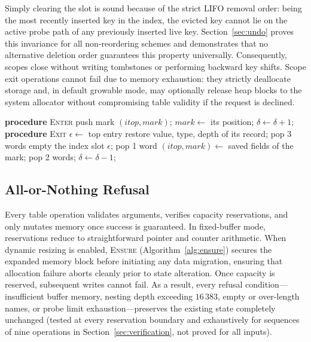 Simply clearing the slot is sound because of the strict LIFO removal order: being the most recently inserted key in the index, the evicted key cannot lie on the active probe path of any previously inserted live key. Section~\ref{sec:undo} proves this invariance for all non-reordering schemes and demonstrates that no alternative deletion order guarantees this property universally. Consequently, scopes close without writing tombstones or performing backward key shifts. Scope exit operations cannot fail due to memory exhaustion: they strictly deallocate storage and, in default growable mode, may optionally release heap blocks to the system allocator without compromising table validity if the request is declined.

\begin{algorithm}[t!]
\caption{\textsc{Enter} and \textsc{Exit}}
\label{alg:scope}
\begin{algorithmic}[1]
\STATE \textbf{procedure} \textsc{Enter}
 \RETURN {} \ENDIF
{} \RETURN {} \ENDIF
{} \RETURN {} \ENDIF \hfill{}
\STATE push mark $(\mathit{itop}, \mathit{mark})$; $\mathit{mark} \leftarrow$ its position; $\delta \leftarrow \delta + 1$; \RETURN {}
\STATE \textbf{procedure} \textsc{Exit}
 \RETURN {} \ENDIF
{} \RETURN {} \ENDIF \hfill{}
  \STATE $\epsilon \leftarrow$ top entry
    \STATE restore value, type, depth of its record; pop 3 words
  \ELSE
    \STATE empty the index slot $\epsilon$; pop 1 word
  \ENDIF
\ENDWHILE
\STATE $(\mathit{itop}, \mathit{mark}) \leftarrow$ saved fields of the mark; pop 2 words; $\delta \leftarrow \delta - 1$; \RETURN {}
\end{algorithmic}
\end{algorithm}

\subsection{All-or-Nothing Refusal}
Every table operation validates arguments, verifies capacity reservations, and only mutates memory once success is guaranteed. In fixed-buffer mode, reservations reduce to straightforward pointer and counter arithmetic. When dynamic resizing is enabled, \textsc{Ensure} (Algorithm~\ref{alg:ensure}) secures the expanded memory block before initiating any data migration, ensuring that allocation failure aborts cleanly prior to state alteration. Once capacity is reserved, subsequent writes cannot fail. As a result, every refusal condition—insufficient buffer memory, nesting depth exceeding $16\,383$, empty or over-length names, or probe limit exhaustion—preserves the existing state completely unchanged (tested at every reservation boundary and exhaustively for sequences of nine operations in Section~\ref{sec:verification}, not proved for all inputs).

